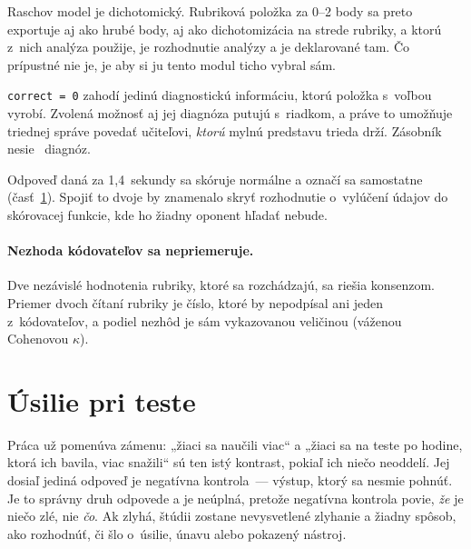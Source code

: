 \begin{description}[leftmargin=0.6cm, nosep]
    \item[\textbf{Čiastočné body oddelene od dichotómie.}] Raschov model je
          dichotomický. Rubriková položka za 0--2 body sa preto exportuje aj ako
          hrubé body, aj ako dichotomizácia na strede rubriky, a ktorú z~nich
          analýza použije, je rozhodnutie analýzy a je deklarované tam. Čo
          prípustné nie je, je aby si ju tento modul ticho vybral sám.
    \item[\textbf{Zaznamenáva sa rozptyľovač, nie len nesprávnosť.}]
          \texttt{correct = 0} zahodí jedinú diagnostickú informáciu, ktorú
          položka s~voľbou vyrobí. Zvolená možnosť aj jej diagnóza putujú
          s~riadkom, a práve to umožňuje triednej správe povedať učiteľovi,
          \emph{ktorú} mylnú predstavu trieda drží. Zásobník nesie
          \asmDistractorsDiagnosed{}~diagnóz.
    \item[\textbf{Skórovanie je oddelené od vylúčenia.}] Odpoveď daná za
          1{,}4~sekundy sa skóruje normálne a označí sa samostatne
          (časť~\ref{sec:usilie}). Spojiť to dvoje by znamenalo skryť rozhodnutie
          o~vylúčení údajov do skórovacej funkcie, kde ho žiadny oponent hľadať
          nebude.
\end{description}

\paragraph{Nezhoda kódovateľov sa nepriemeruje.} Dve nezávislé hodnotenia rubriky,
ktoré sa rozchádzajú, sa riešia konsenzom. Priemer dvoch čítaní rubriky je číslo,
ktoré by nepodpísal ani jeden z~kódovateľov, a podiel nezhôd je sám vykazovanou
veličinou (váženou Cohenovou $\kappa$).

\section{Úsilie pri teste}
\label{sec:usilie}

Práca už pomenúva zámenu: „žiaci sa naučili viac“ a „žiaci sa na teste po hodine,
ktorá ich bavila, viac snažili“ sú ten istý kontrast, pokiaľ ich niečo neoddelí.
Jej dosiaľ jediná odpoveď je negatívna kontrola~--- výstup, ktorý sa nesmie
pohnúť. Je to správny druh odpovede a je neúplná, pretože negatívna kontrola
povie, \emph{že} je niečo zlé, nie \emph{čo}. Ak zlyhá, štúdii zostane
nevysvetlené zlyhanie a žiadny spôsob, ako rozhodnúť, či šlo o~úsilie, únavu
alebo pokazený nástroj.

